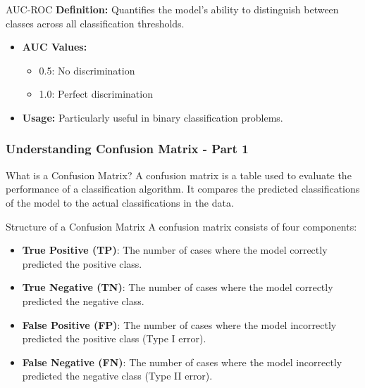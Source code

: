 \documentclass[aspectratio=169]{beamer}
\begin{document}
\begin{frame}[fragile]
    \begin{block}{AUC-ROC}
        \textbf{Definition:} Quantifies the model's ability to distinguish between classes across all classification thresholds.
        \begin{itemize}
            \item \textbf{AUC Values:} 
                \begin{itemize}
                    \item 0.5: No discrimination
                    \item 1.0: Perfect discrimination
                \end{itemize}
            \item \textbf{Usage:} Particularly useful in binary classification problems.
        \end{itemize}
    \end{block}
\end{frame}

\begin{frame}[fragile]
    \frametitle{Understanding Confusion Matrix - Part 1}
    \begin{block}{What is a Confusion Matrix?}
        A confusion matrix is a table used to evaluate the performance of a classification algorithm. 
        It compares the predicted classifications of the model to the actual classifications in the data.
    \end{block}
    
    \begin{block}{Structure of a Confusion Matrix}
        A confusion matrix consists of four components:
        \begin{itemize}
            \item \textbf{True Positive (TP)}: The number of cases where the model correctly predicted the positive class.
            \item \textbf{True Negative (TN)}: The number of cases where the model correctly predicted the negative class.
            \item \textbf{False Positive (FP)}: The number of cases where the model incorrectly predicted the positive class (Type I error).
            \item \textbf{False Negative (FN)}: The number of cases where the model incorrectly predicted the negative class (Type II error).
        \end{itemize}
    \end{block}
\end{frame}
\end{document}
